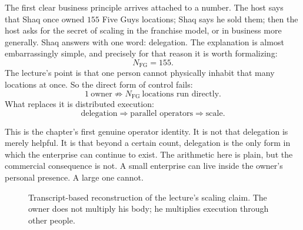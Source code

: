 The first clear business principle arrives attached to a number. The host says that Shaq once owned \(155\) Five Guys locations; Shaq says he sold them; then the host asks for the secret of scaling in the franchise model, or in business more generally. Shaq answers with one word: delegation. The explanation is almost embarrassingly simple, and precisely for that reason it is worth formalizing:
\begin{equation}
N_{\text{FG}} = 155.
\end{equation}
The lecture's point is that one person cannot physically inhabit that many locations at once. So the direct form of control fails:
\begin{equation}
1\ \text{owner} \not\Rightarrow N_{\text{FG}}\ \text{locations run directly}.
\end{equation}
What replaces it is distributed execution:
\begin{equation}
\text{delegation} \Rightarrow \text{parallel operators} \Rightarrow \text{scale}.
\end{equation}

This is the chapter's first genuine operator identity. It is not that delegation is merely helpful. It is that beyond a certain count, delegation is the only form in which the enterprise can continue to exist. The arithmetic here is plain, but the commercial consequence is not. A small enterprise can live inside the owner's personal presence. A large one cannot.

\begin{figure}[h]
\centering
{}
\caption{Transcript-based reconstruction of the lecture's scaling claim. The owner does not multiply his body; he multiplies execution through other people.}
\end{figure}

